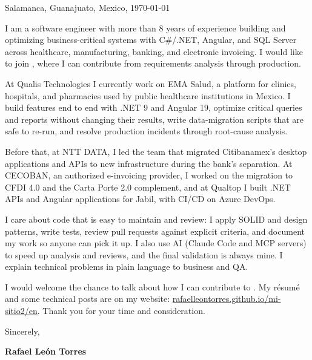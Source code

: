 \documentclass[en,11pt]{yaac-rl}
\begin{document}
\raggedright
\makecvheader

\hfill Salamanca, Guanajuato, Mexico, \today


I am a software engineer with more than 8 years of experience building and optimizing business-critical systems with C\#/.NET, Angular, and SQL Server across healthcare, manufacturing, banking, and electronic invoicing. I would like to join  , where I can contribute from requirements analysis through production.

At Qualis Technologies I currently work on EMA Salud, a platform for clinics, hospitals, and pharmacies used by public healthcare institutions in Mexico. I build features end to end with .NET 9 and Angular 19, optimize critical queries and reports without changing their results, write data-migration scripts that are safe to re-run, and resolve production incidents through root-cause analysis.

Before that, at NTT DATA, I led the team that migrated Citibanamex's desktop applications and APIs to new infrastructure during the bank's separation. At CECOBAN, an authorized e-invoicing provider, I worked on the migration to CFDI 4.0 and the Carta Porte 2.0 complement, and at Qualtop I built .NET APIs and Angular applications for Jabil, with CI/CD on Azure DevOps.

I care about code that is easy to maintain and review: I apply SOLID and design patterns, write tests, review pull requests against explicit criteria, and document my work so anyone can pick it up. I also use AI (Claude Code and MCP servers) to speed up analysis and reviews, and the final validation is always mine. I explain technical problems in plain language to business and QA.

I would welcome the chance to talk about how I can contribute to . My résumé and some technical posts are on my website: \href{https://rafaelleontorres.github.io/mi-sitio2/en/}{rafaelleontorres.github.io/mi-sitio2/en}. Thank you for your time and consideration.

Sincerely,

\medskip
\textbf{Rafael León Torres}
\end{document}
